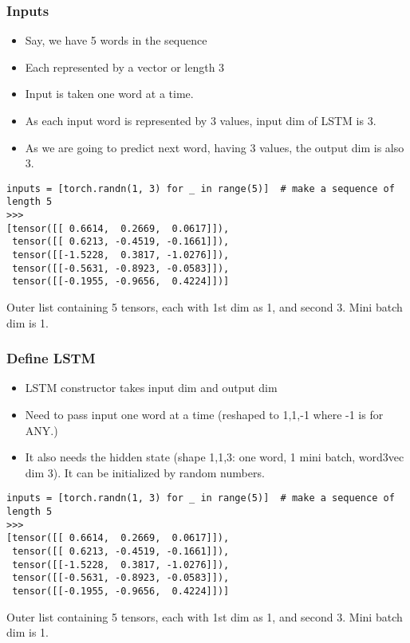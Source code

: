 \begin{frame}[fragile]
\frametitle{Inputs}
\begin{itemize}
\item Say, we have 5 words in the sequence
\item Each represented by a vector or length 3
\item Input is taken one word at a time.
\item As each input word is represented by 3 values, input dim of LSTM is 3.
\item As we are going to predict next word, having 3 values, the output dim is also 3.
\end{itemize}
 \begin{lstlisting}
inputs = [torch.randn(1, 3) for _ in range(5)]  # make a sequence of length 5
>>>
[tensor([[ 0.6614,  0.2669,  0.0617]]),
 tensor([[ 0.6213, -0.4519, -0.1661]]),
 tensor([[-1.5228,  0.3817, -1.0276]]),
 tensor([[-0.5631, -0.8923, -0.0583]]),
 tensor([[-0.1955, -0.9656,  0.4224]])]
\end{lstlisting}        
Outer list containing 5 tensors, each with 1st dim as 1, and second 3. Mini batch dim is 1.
\end{frame} 

\begin{frame}[fragile]
\frametitle{Define LSTM}
\begin{itemize}
\item LSTM constructor takes input dim and output dim
\item Need to pass input one word at a time (reshaped to 1,1,-1 where -1 is for ANY.)
\item It also needs the hidden state (shape 1,1,3: one word, 1 mini batch, word3vec dim 3). It can be initialized by random numbers.
\end{itemize}
 \begin{lstlisting}
inputs = [torch.randn(1, 3) for _ in range(5)]  # make a sequence of length 5
>>>
[tensor([[ 0.6614,  0.2669,  0.0617]]),
 tensor([[ 0.6213, -0.4519, -0.1661]]),
 tensor([[-1.5228,  0.3817, -1.0276]]),
 tensor([[-0.5631, -0.8923, -0.0583]]),
 tensor([[-0.1955, -0.9656,  0.4224]])]
\end{lstlisting}        
Outer list containing 5 tensors, each with 1st dim as 1, and second 3. Mini batch dim is 1.
\end{frame} 

